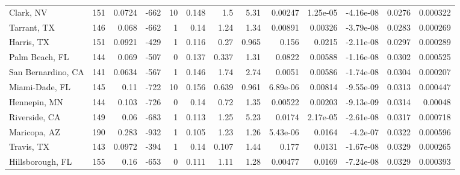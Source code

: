 \documentclass[12pt,letterpaper]{article}
\begin{document}
\begin{appendices}
\begin{sidewaystable}
{\begin{tabular}{lrrrrrrrrrrrr}
 Clark, NV          & 151   & 0.0724  &  -662 &    10 &           0.148 &            1.5   &          5.31  &    0.00247   &     1.25e-05 &        -4.16e-08 &           0.0276  &       0.000322  \\
 Tarrant, TX        & 146   & 0.068   &  -662 &     1 &           0.14  &            1.24  &          1.34  &    0.00891   &     0.00326  &        -3.79e-08 &           0.0283  &       0.000269  \\
 Harris, TX         & 151   & 0.0921  &  -429 &     1 &           0.116 &            0.27  &          0.965 &    0.156     &     0.0215   &        -2.11e-08 &           0.0297  &       0.000289  \\
 Palm Beach, FL     & 144   & 0.069   &  -507 &     0 &           0.137 &            0.337 &          1.31  &    0.0822    &     0.00588  &        -1.16e-08 &           0.0302  &       0.000525  \\
 San Bernardino, CA & 141   & 0.0634  &  -567 &     1 &           0.146 &            1.74  &          2.74  &    0.0051    &     0.00586  &        -1.74e-08 &           0.0304  &       0.000207  \\
 Miami-Dade, FL     & 145   & 0.11    &  -722 &    10 &           0.156 &            0.639 &          0.961 &    6.89e-06  &     0.00814  &        -9.55e-09 &           0.0313  &       0.000447  \\
 Hennepin, MN       & 144   & 0.103   &  -726 &     0 &           0.14  &            0.72  &          1.35  &    0.00522   &     0.00203  &        -9.13e-09 &           0.0314  &       0.00048   \\
 Riverside, CA      & 149   & 0.06    &  -683 &     1 &           0.113 &            1.25  &          5.23  &    0.0174    &     2.17e-05 &        -2.61e-08 &           0.0317  &       0.000718  \\
 Maricopa, AZ       & 190   & 0.283   &  -932 &     1 &           0.105 &            1.23  &          1.26  &    5.43e-06  &     0.0164   &        -4.2e-07  &           0.0322  &       0.000596  \\
 Travis, TX         & 143   & 0.0972  &  -394 &     1 &           0.14  &            0.107 &          1.44  &    0.177     &     0.0131   &        -1.67e-08 &           0.0329  &       0.000265  \\
 Hillsborough, FL   & 155   & 0.16    &  -653 &     0 &           0.111 &            1.11  &          1.28  &    0.00477   &     0.0169   &        -7.24e-08 &           0.0329  &       0.000393  \\

\end{tabular}}
\end{sidewaystable}
\end{appendices}
\end{document}
